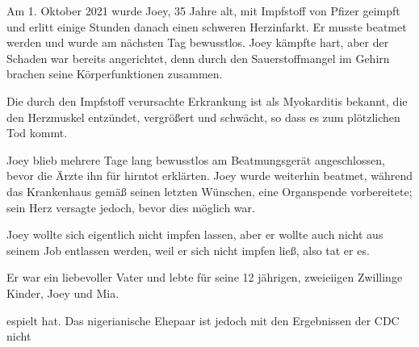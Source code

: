 Am 1. Oktober 2021 wurde Joey, 35 Jahre alt, mit Impfstoff von Pfizer geimpft
und erlitt einige Stunden danach einen schweren Herzinfarkt. Er musste beatmet
werden und wurde am nächsten Tag bewusstlos. Joey kämpfte hart, aber der Schaden
war bereits angerichtet, denn durch den Sauerstoffmangel im Gehirn brachen seine
Körperfunktionen zusammen.

Die durch den Impfstoff verursachte Erkrankung ist als Myokarditis bekannt, die
den Herzmuskel entzündet, vergrößert und schwächt, so dass es zum plötzlichen
Tod kommt.

Joey blieb mehrere Tage lang bewusstlos am Beatmungsgerät angeschlossen, bevor
die Ärzte ihn für hirntot erklärten. Joey wurde weiterhin beatmet, während das
Krankenhaus gemäß seinen letzten Wünschen, eine Organspende vorbereitete; sein
Herz versagte jedoch, bevor dies möglich war.

Joey wollte sich eigentlich nicht impfen lassen, aber er wollte auch nicht aus
seinem Job entlassen werden, weil er sich nicht impfen ließ, also tat er es.

Er war ein liebevoller Vater und lebte für seine 12 jährigen, zweieiigen
Zwillinge Kinder, Joey und Mia.

espielt hat. Das nigerianische Ehepaar ist jedoch mit den Ergebnissen der CDC
nicht
